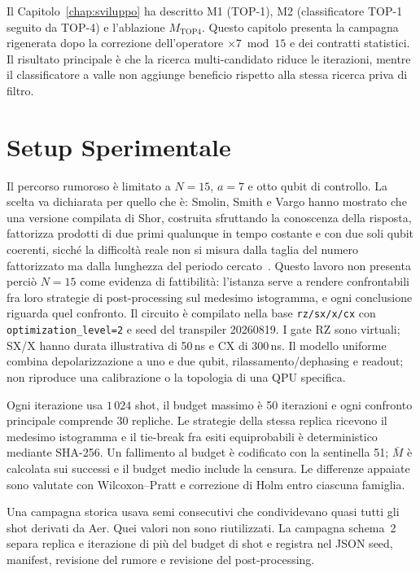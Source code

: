 \begin{onehalfspace}

Il Capitolo~\ref{chap:sviluppo} ha descritto M1 (TOP-1), M2
(classificatore TOP-1 seguito da TOP-4) e l'ablazione
$M_{\mathrm{TOP4}}$. Questo capitolo presenta la campagna rigenerata
dopo la correzione dell'operatore $\times7\bmod15$ e dei contratti
statistici. Il risultato principale è che la ricerca multi-candidato
riduce le iterazioni, mentre il classificatore a valle non aggiunge
beneficio rispetto alla stessa ricerca priva di filtro.

\section{Setup Sperimentale}
\label{sec:setup_m1}
\label{sec:setup_m2}

Il percorso rumoroso è limitato a $N=15$, $a=7$ e otto qubit di
controllo. La scelta va dichiarata per quello che è: Smolin, Smith e
Vargo hanno mostrato che una versione compilata di Shor, costruita
sfruttando la conoscenza della risposta, fattorizza prodotti di due
primi qualunque in tempo costante e con due soli qubit coerenti, sicché
la difficoltà reale non si misura dalla taglia del numero fattorizzato
ma dalla lunghezza del periodo cercato~\cite{smolin2013}. Questo lavoro
non presenta perciò $N=15$ come evidenza di fattibilità: l'istanza serve
a rendere confrontabili fra loro strategie di post-processing sul
medesimo istogramma, e ogni conclusione riguarda quel confronto. Il
circuito è compilato nella base
\texttt{rz/sx/x/cx} con \texttt{optimization\_level=2} e seed del
transpiler 20260819. I gate RZ sono virtuali; SX/X hanno durata
illustrativa di 50\,ns e CX di 300\,ns. Il modello uniforme combina
depolarizzazione a uno e due qubit, rilassamento/dephasing e readout; non
riproduce una calibrazione o la topologia di una QPU specifica.

Ogni iterazione usa $1\,024$ shot, il budget massimo è 50 iterazioni e
ogni confronto principale comprende 30 repliche. Le strategie della
stessa replica ricevono il medesimo istogramma e il tie-break fra esiti
equiprobabili è deterministico mediante SHA-256. Un fallimento al budget
è codificato con la sentinella 51; $\bar M$ è calcolata sui successi e il
budget medio include la censura. Le differenze appaiate sono valutate con
Wilcoxon--Pratt e correzione di Holm entro ciascuna famiglia.

Una campagna storica usava semi consecutivi che condividevano quasi tutti
gli shot derivati da Aer. Quei valori non sono riutilizzati. La campagna
schema~2 separa replica e iterazione di più del budget di shot e registra
nel JSON seed, manifest, revisione del rumore e revisione del
post-processing.


\end{onehalfspace}
